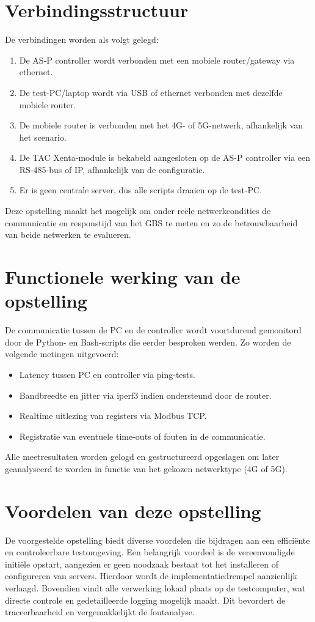 \section{Verbindingsstructuur}
De verbindingen worden als volgt gelegd:
\begin{enumerate}
    \item De AS-P controller wordt verbonden met een mobiele router/gateway via ethernet.
    \item De test-PC/laptop wordt via USB of ethernet verbonden met dezelfde mobiele router.
    \item De mobiele router is verbonden met het 4G- of 5G-netwerk, afhankelijk van het scenario.
    \item De TAC Xenta-module is bekabeld aangesloten op de AS-P controller via een RS-485-bus of IP, afhankelijk van de configuratie.
    \item Er is geen centrale server, dus alle scripts draaien op de test-PC.
\end{enumerate}

Deze opstelling maakt het mogelijk om onder reële netwerkcondities de communicatie en responstijd van het GBS te meten en zo de betrouwbaarheid van beide netwerken te evalueren.

\section{Functionele werking van de opstelling}

De communicatie tussen de PC en de controller wordt voortdurend gemonitord door de Python- en Bash-scripts die eerder besproken werden. Zo worden de volgende metingen uitgevoerd:
\begin{itemize}
    \item Latency tussen PC en controller via ping-tests.
    \item Bandbreedte en jitter via iperf3 indien ondersteund door de router.
    \item Realtime uitlezing van registers via Modbus TCP.
    \item Registratie van eventuele time-outs of fouten in de communicatie.
\end{itemize}

Alle meetresultaten worden gelogd en gestructureerd opgeslagen om later geanalyseerd te worden in functie van het gekozen netwerktype (4G of 5G).

\section{Voordelen van deze opstelling}
De voorgestelde opstelling biedt diverse voordelen die bijdragen aan een efficiënte en controleerbare testomgeving. Een belangrijk voordeel is de vereenvoudigde initiële opstart, aangezien er geen noodzaak bestaat tot het installeren of configureren van servers. Hierdoor wordt de implementatiedrempel aanzienlijk verlaagd. Bovendien vindt alle verwerking lokaal plaats op de testcomputer, wat directe controle en gedetailleerde logging mogelijk maakt. Dit bevordert de traceerbaarheid en vergemakkelijkt de foutanalyse.

